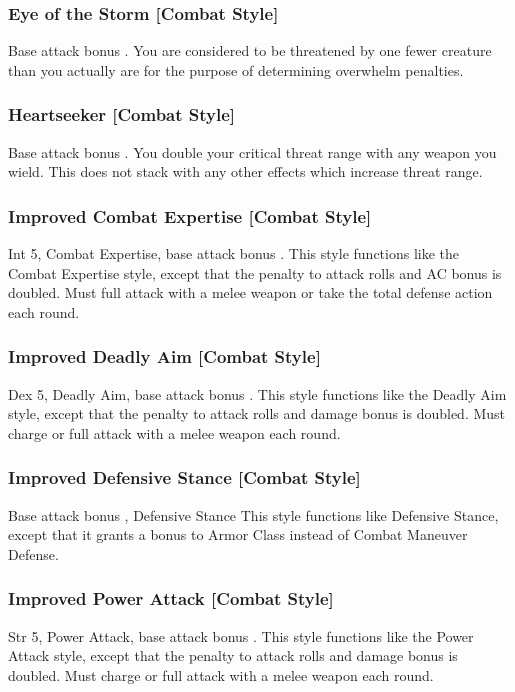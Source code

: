 \subsubsection{Eye of the Storm [Combat Style]}
 Base attack bonus .
 You are considered to be threatened by one fewer creature than you actually are for the purpose of determining overwhelm penalties.

\subsubsection{Heartseeker [Combat Style]}
 Base attack bonus .
 You double your critical threat range with any weapon you wield. This does not stack with any other effects which increase threat range.

\subsubsection{Improved Combat Expertise [Combat Style]}
 Int 5, Combat Expertise, base attack bonus .
 This style functions like the Combat Expertise style, except that the penalty to attack rolls and AC bonus is doubled.
 Must full attack with a melee weapon or take the total defense action each round.

\subsubsection{Improved Deadly Aim [Combat Style]}
 Dex 5, Deadly Aim, base attack bonus .
 This style functions like the Deadly Aim style, except that the penalty to attack rolls and damage bonus is doubled.
 Must charge or full attack with a melee weapon each round.

\subsubsection{Improved Defensive Stance [Combat Style]}
 Base attack bonus , Defensive Stance
 This style functions like Defensive Stance, except that it grants a bonus to Armor Class instead of Combat Maneuver Defense.

\subsubsection{Improved Power Attack [Combat Style]}
 Str 5, Power Attack, base attack bonus .
 This style functions like the Power Attack style, except that the penalty to attack rolls and damage bonus is doubled.
 Must charge or full attack with a melee weapon each round.

